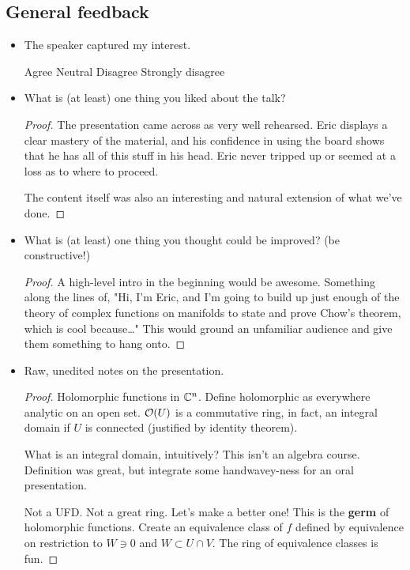 \documentclass[../finalProject.tex]{subfiles}
\begin{document}
\subsection*{General feedback}
\begin{itemize}
    \item The speaker captured my interest.
    \begin{center}
         \hspace{1em} Agree \hspace{1em} Neutral \hspace{1em} Disagree \hspace{1em} Strongly disagree
    \end{center}
    \item What is (at least) one thing you liked about the talk?
    \begin{proof}
        The presentation came across as very well rehearsed. Eric displays a clear mastery of the material, and his confidence in using the board shows that he has all of this stuff in his head. Eric never tripped up or seemed at a loss as to where to proceed.\par
        The content itself was also an interesting and natural extension of what we've done.
    \end{proof}
    \item What is (at least) one thing you thought could be improved? (be constructive!)
    \begin{proof}
        A high-level intro in the beginning would be awesome. Something along the lines of, "Hi, I'm Eric, and I'm going to build up just enough of the theory of complex functions on manifolds to state and prove Chow's theorem, which is cool because\dots" This would ground an unfamiliar audience and give them something to hang onto. 
    \end{proof}
    \item Raw, unedited notes on the presentation.
    \begin{proof}
        Holomorphic functions in $\mathbb{C}^n$. Define holomorphic as everywhere analytic on an open set. $\mathcal{O}(U)$ is a commutative ring, in fact, an integral domain if $U$ is connected (justified by identity theorem).

        What is an integral domain, intuitively? This isn't an algebra course. Definition was great, but integrate some handwavey-ness for an oral presentation.

        Not a UFD. Not a great ring. Let's make a better one! This is the \textbf{germ} of holomorphic functions. Create an equivalence class of $f$ defined by equivalence on restriction to $W\ni 0$ and $W\subset U\cap V$. The ring of equivalence classes is fun.


\end{proof}
\end{itemize}
\end{document}
